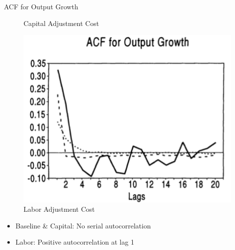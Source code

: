 \documentclass[10pt]{beamer}
\begin{document}
\begin{frame}{ACF for Output Growth}
\begin{minipage}{0.33\textwidth}
\begin{figure}
  \caption{Capital Adjustment Cost}
\end{figure}
\end{minipage}%
\begin{minipage}{0.33\textwidth}
\begin{figure}
  \centering
  \includegraphics[width=\linewidth]{L_ACF.png}
  \caption{Labor Adjustment Cost}
\end{figure}
\end{minipage}

\begin{itemize}
    \item Baseline \& Capital: No serial autocorrelation
    \item Labor: Positive autocorrelation at lag 1
\end{itemize}

\end{frame}
\end{document}
